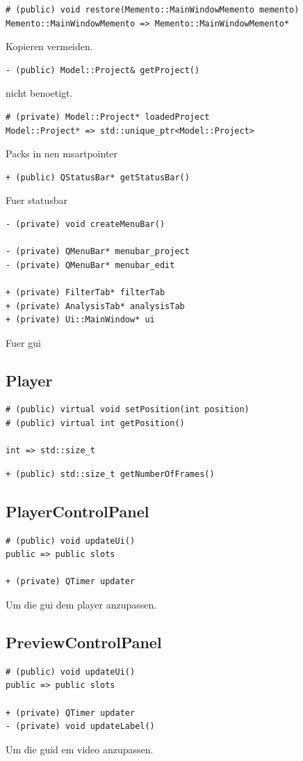 \documentclass{scrartcl}
\begin{document}
{\begin{verbatim}
# (public) void restore(Memento::MainWindowMemento memento)
Memento::MainWindowMemento => Memento::MainWindowMemento*
\end{verbatim}
Kopieren vermeiden.
\begin{verbatim}
- (public) Model::Project& getProject()
\end{verbatim}
nicht benoetigt.
\begin{verbatim}
# (private) Model::Project* loadedProject
Model::Project* => std::unique_ptr<Model::Project>
\end{verbatim}
Packs in nen msartpointer
\begin{verbatim}
+ (public) QStatusBar* getStatusBar()
\end{verbatim}
Fuer statusbar
\begin{verbatim}
- (private) void createMenuBar()

- (private) QMenuBar* menubar_project
- (private) QMenuBar* menubar_edit

+ (private) FilterTab* filterTab
+ (private) AnalysisTab* analysisTab
+ (private) Ui::MainWindow* ui
\end{verbatim}
Fuer gui
\subsection{Player}
\begin{verbatim}
# (public) virtual void setPosition(int position)
# (public) virtual int getPosition()

int => std::size_t
\end{verbatim}
\begin{verbatim}
+ (public) std::size_t getNumberOfFrames()
\end{verbatim}
\subsection{PlayerControlPanel}
\begin{verbatim}
# (public) void updateUi()
public => public slots

+ (private) QTimer updater
\end{verbatim}
Um die gui dem player anzupassen.
\subsection{PreviewControlPanel}
\begin{verbatim}
# (public) void updateUi()
public => public slots

+ (private) QTimer updater
- (private) void updateLabel()
\end{verbatim}
Um die guid em video anzupassen.
}
\end{document}
